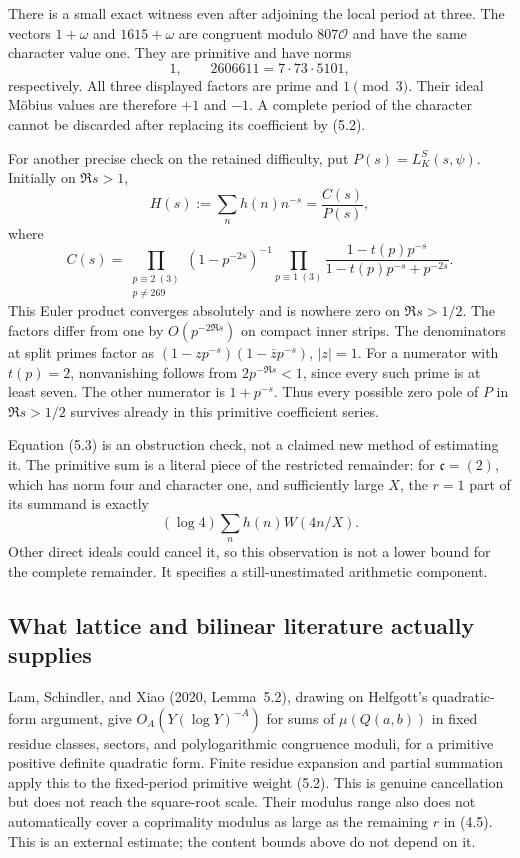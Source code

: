 \documentclass[11pt]{article}
\newcommand{\OO}{\mathcal O}
\begin{document}
There is a small exact witness even after adjoining the local
period at three. The vectors $1+\omega$ and $1615+\omega$
are congruent modulo $807\OO$ and have the same character
value one. They are primitive and have norms
\[
                    1,\qquad
       2606611=7\cdot73\cdot5101,
\]
respectively. All three displayed factors are prime and
$1\pmod3$. Their ideal M\"obius values are therefore
$+1$ and $-1$. A complete period of the character cannot
be discarded after replacing its coefficient by (5.2).

For another precise check on the retained difficulty, put
$P(s)=L_K^S(s,\psi)$. Initially on $\Re s>1$,
\[
 H(s):=\sum_n h(n)n^{-s}=\frac{C(s)}{P(s)},                \tag{5.3}
\]
where
\[
 C(s)=
 \prod_{\substack{p\equiv2\ (3)\\p\ne269}}
       (1-p^{-2s})^{-1}
 \prod_{p\equiv1\ (3)}
       \frac{1-t(p)p^{-s}}
            {1-t(p)p^{-s}+p^{-2s}}.                     \tag{5.4}
\]
This Euler product converges absolutely and is nowhere zero
on $\Re s>1/2$. The factors differ from one by
$O(p^{-2\Re s})$ on compact inner strips.
The denominators at split primes factor as
$(1-zp^{-s})(1-\bar z p^{-s})$, $|z|=1$.
For a numerator with $t(p)=2$, nonvanishing follows from
$2p^{-\Re s}<1$, since every such prime is at least seven.
The other numerator is $1+p^{-s}$.
Thus every possible zero pole of $P$ in $\Re s>1/2$
survives already in this primitive coefficient series.

Equation (5.3) is an obstruction check, not a claimed new
method of estimating it. The primitive sum is a literal
piece of the restricted remainder: for $\mathfrak c=(2)$, which
has norm four and character one, and sufficiently large $X$,
the $r=1$ part of its summand is exactly
\[
                       (\log4)\sum_n h(n)W(4n/X).
                                                        \tag{5.5}
\]
Other direct ideals could cancel it, so this observation is
not a lower bound for the complete remainder.
It specifies a still-unestimated arithmetic component.

\subsection{What lattice and bilinear literature actually supplies}

Lam, Schindler, and Xiao (2020, Lemma~5.2), drawing on
Helfgott's quadratic-form argument, give
$O_A(Y(\log Y)^{-A})$ for sums of $\mu(Q(a,b))$ in fixed
residue classes, sectors, and polylogarithmic congruence
moduli, for a primitive positive definite quadratic form.
Finite residue expansion and partial summation apply this
to the fixed-period primitive weight (5.2).
This is genuine cancellation but does not reach the
square-root scale. Their modulus range also does not
automatically cover a coprimality modulus as large as the
remaining $r$ in (4.5).
This is an external estimate; the content bounds above do not depend on it.
\end{document}
